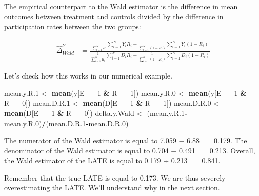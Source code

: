 \documentclass[]{book}
\newenvironment{Shaded}{\begin{snugshade}}{\end{snugshade}}
\newcommand{\DecValTok}[1]{\textcolor[rgb]{0.00,0.00,0.81}{#1}}
\newcommand{\FloatTok}[1]{\textcolor[rgb]{0.00,0.00,0.81}{#1}}
\newcommand{\KeywordTok}[1]{\textcolor[rgb]{0.13,0.29,0.53}{\textbf{#1}}}
\newcommand{\NormalTok}[1]{#1}
\newcommand{\OperatorTok}[1]{\textcolor[rgb]{0.81,0.36,0.00}{\textbf{#1}}}
\newcommand{\StringTok}[1]{\textcolor[rgb]{0.31,0.60,0.02}{#1}}
\theoremstyle{definition}
\theoremstyle{definition}
\theoremstyle{definition}
\theoremstyle{remark}
\let\BeginKnitrBlock\begin \let\EndKnitrBlock\end
\begin{document}
The empirical counterpart to the Wald estimator is the difference in mean outcomes between treatment and controls divided by the difference in participation rates between the two groups:

\begin{align*}
\hat{\Delta}^Y_{Wald} & = \frac{\frac{1}{\sum_{i=1}^N R_i}\sum_{i=1}^N Y_iR_i-\frac{1}{\sum_{i=1}^N (1-R_i)}\sum_{i=1}^N Y_i(1-R_i)}{\frac{1}{\sum_{i=1}^N R_i}\sum_{i=1}^N D_iR_i-\frac{1}{\sum_{i=1}^N (1-R_i)}\sum_{i=1}^N D_i(1-R_i)}
\end{align*}

\BeginKnitrBlock{example}
\protect\hypertarget{exm:unnamed-chunk-121}{}{\label{exm:unnamed-chunk-121} }Let's check how this works in our numerical example.
\EndKnitrBlock{example}

\begin{Shaded}
\begin{Highlighting}[]
\NormalTok{mean.y.R}\FloatTok{.1}\NormalTok{ <-}\StringTok{ }\KeywordTok{mean}\NormalTok{(y[E}\OperatorTok{==}\DecValTok{1} \OperatorTok{&}\StringTok{ }\NormalTok{R}\OperatorTok{==}\DecValTok{1}\NormalTok{])}
\NormalTok{mean.y.R}\FloatTok{.0}\NormalTok{ <-}\StringTok{ }\KeywordTok{mean}\NormalTok{(y[E}\OperatorTok{==}\DecValTok{1} \OperatorTok{&}\StringTok{ }\NormalTok{R}\OperatorTok{==}\DecValTok{0}\NormalTok{])}
\NormalTok{mean.D.R}\FloatTok{.1}\NormalTok{ <-}\StringTok{ }\KeywordTok{mean}\NormalTok{(D[E}\OperatorTok{==}\DecValTok{1} \OperatorTok{&}\StringTok{ }\NormalTok{R}\OperatorTok{==}\DecValTok{1}\NormalTok{])}
\NormalTok{mean.D.R}\FloatTok{.0}\NormalTok{ <-}\StringTok{ }\KeywordTok{mean}\NormalTok{(D[E}\OperatorTok{==}\DecValTok{1} \OperatorTok{&}\StringTok{ }\NormalTok{R}\OperatorTok{==}\DecValTok{0}\NormalTok{])}
\NormalTok{delta.y.Wald <-}\StringTok{ }\NormalTok{(mean.y.R}\FloatTok{.1}\OperatorTok{-}\NormalTok{mean.y.R}\FloatTok{.0}\NormalTok{)}\OperatorTok{/}\NormalTok{(mean.D.R}\FloatTok{.1}\OperatorTok{-}\NormalTok{mean.D.R}\FloatTok{.0}\NormalTok{)}
\end{Highlighting}
\end{Shaded}

The numerator of the Wald estimator is equal to 7.059 \(-\) 6.88 \(=\) 0.179.
The denominator of the Wald estimator is equal to 0.704 \(-\) 0.491 \(=\) 0.213.
Overall, the Wald estimator of the LATE is equal to 0.179 \(\div\) 0.213 \(=\) 0.841.

Remember that the true LATE is equal to 0.173.
We are thus severely overestimating the LATE.
We'll understand why in the next section.
\end{document}
